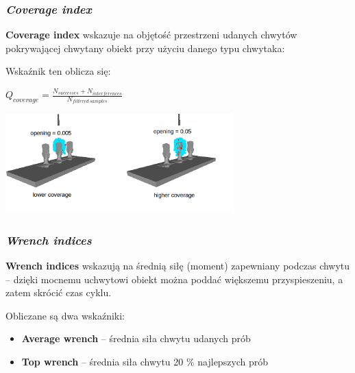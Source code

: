 \documentclass[12pt,a4paper,portrait]{beamer}
\begin{document}
\begin{frame}
\frametitle{\textit{Coverage index}}
\textbf{Coverage index} wskazuje na objętość przestrzeni udanych chwytów pokrywającej chwytany obiekt przy użyciu danego typu chwytaka:


Wskaźnik ten oblicza się:
\begin{center}
$Q_{coverage} = \frac{N_{successes}+N_{interferences}}{N_{filtered\ samples}}$

\includegraphics[width=0.66\textwidth]{images/coverage}
\end{center}
\end{frame}

\begin{frame}
\frametitle{\textit{Wrench indices}}
\textbf{Wrench indices} wskazują na średnią siłę (moment) zapewniany podczas chwytu -- dzięki mocnemu uchwytowi obiekt można poddać większemu przyspieszeniu, a zatem skrócić czas cyklu.

Obliczane są dwa wskaźniki:
\begin{itemize}
\item \textbf{Average wrench} -- średnia siła chwytu udanych prób
\item \textbf{Top wrench} -- średnia siła chwytu 20 \% najlepszych prób
\end{itemize}
\end{frame}
\end{document}

